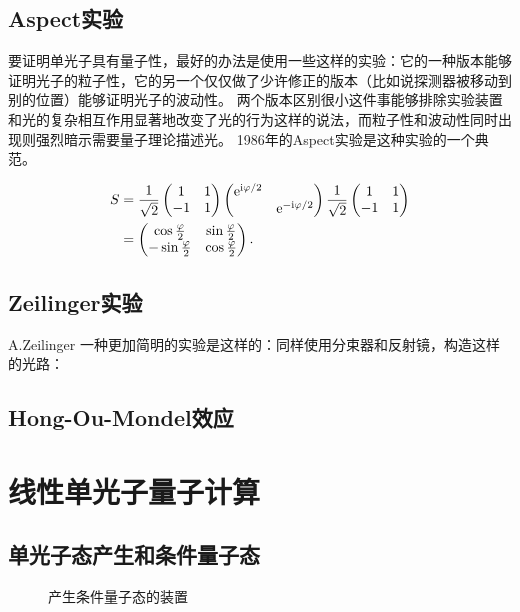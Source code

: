 \subsection{Aspect实验}

要证明单光子具有量子性，最好的办法是使用一些这样的实验：它的一种版本能够证明光子的粒子性，它的另一个仅仅做了少许修正的版本（比如说探测器被移动到别的位置）能够证明光子的波动性。
两个版本区别很小这件事能够排除实验装置和光的复杂相互作用显著地改变了光的行为这样的说法，而粒子性和波动性同时出现则强烈暗示需要量子理论描述光。
1986年的Aspect实验是这种实验的一个典范。

\begin{equation}
    \begin{aligned}
        S &= \frac{1}{\sqrt{2}} \pmqty{1 & 1 \\ -1 & 1} \pmqty{ \dmat{\ee^{\ii \varphi / 2}, \ee^{- \ii \varphi / 2}} } \frac{1}{\sqrt{2}} \pmqty{1 & 1 \\ -1 & 1}  \\
        &= \pmqty{\cos\frac{\varphi}{2} & \sin\frac{\varphi}{2} \\ - \sin\frac{\varphi}{2} & \cos\frac{\varphi}{2}}.
    \end{aligned}
\end{equation}

\subsection{Zeilinger实验}

A.Zeilinger
一种更加简明的实验是这样的：同样使用分束器和反射镜，构造这样的光路：

\subsection{Hong-Ou-Mondel效应}

\section{线性单光子量子计算}

\subsection{单光子态产生和条件量子态}

\begin{figure}
    \centering
    
    \caption{产生条件量子态的装置}
    \label{fig:condition-photon}
\end{figure}

